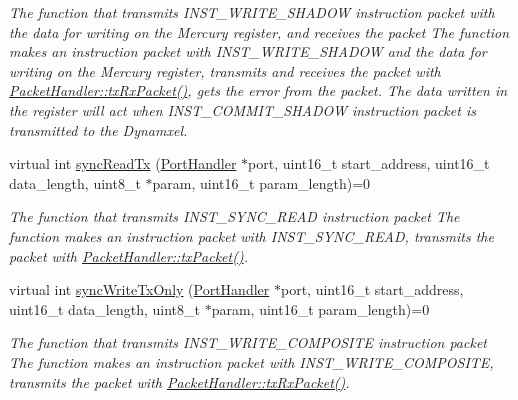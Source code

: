 \begin{DoxyCompactItemize}
\begin{DoxyCompactList}\small\item\em The function that transmits I\+N\+S\+T\+\_\+\+W\+R\+I\+T\+E\+\_\+\+S\+H\+A\+D\+OW instruction packet with the data for writing on the Mercury register, and receives the packet  The function makes an instruction packet with I\+N\+S\+T\+\_\+\+W\+R\+I\+T\+E\+\_\+\+S\+H\+A\+D\+OW and the data for writing on the Mercury register,  transmits and receives the packet with \hyperlink{classmercury_1_1_packet_handler_ac7ceeaec210827d119199144badaad3a}{Packet\+Handler\+::tx\+Rx\+Packet()},  gets the error from the packet.  The data written in the register will act when I\+N\+S\+T\+\_\+\+C\+O\+M\+M\+I\+T\+\_\+\+S\+H\+A\+D\+OW instruction packet is transmitted to the Dynamxel. \end{DoxyCompactList}\item 
virtual int \hyperlink{classmercury_1_1_packet_handler_af51ee95bfc3f386235e746b1418d5d38}{sync\+Read\+Tx} (\hyperlink{classmercury_1_1_port_handler}{Port\+Handler} $\ast$port, uint16\+\_\+t start\+\_\+address, uint16\+\_\+t data\+\_\+length, uint8\+\_\+t $\ast$param, uint16\+\_\+t param\+\_\+length)=0
\begin{DoxyCompactList}\small\item\em The function that transmits I\+N\+S\+T\+\_\+\+S\+Y\+N\+C\+\_\+\+R\+E\+AD instruction packet  The function makes an instruction packet with I\+N\+S\+T\+\_\+\+S\+Y\+N\+C\+\_\+\+R\+E\+AD,  transmits the packet with \hyperlink{classmercury_1_1_packet_handler_acc3f84f0d952dc2d827d8500de512abe}{Packet\+Handler\+::tx\+Packet()}. \end{DoxyCompactList}\item 
virtual int \hyperlink{classmercury_1_1_packet_handler_aa4c16ce358c78638f49f6dc1b5b141bd}{sync\+Write\+Tx\+Only} (\hyperlink{classmercury_1_1_port_handler}{Port\+Handler} $\ast$port, uint16\+\_\+t start\+\_\+address, uint16\+\_\+t data\+\_\+length, uint8\+\_\+t $\ast$param, uint16\+\_\+t param\+\_\+length)=0
\begin{DoxyCompactList}\small\item\em The function that transmits I\+N\+S\+T\+\_\+\+W\+R\+I\+T\+E\+\_\+\+C\+O\+M\+P\+O\+S\+I\+TE instruction packet  The function makes an instruction packet with I\+N\+S\+T\+\_\+\+W\+R\+I\+T\+E\+\_\+\+C\+O\+M\+P\+O\+S\+I\+TE,  transmits the packet with \hyperlink{classmercury_1_1_packet_handler_ac7ceeaec210827d119199144badaad3a}{Packet\+Handler\+::tx\+Rx\+Packet()}. \end{DoxyCompactList}\item 

\end{DoxyCompactItemize}
